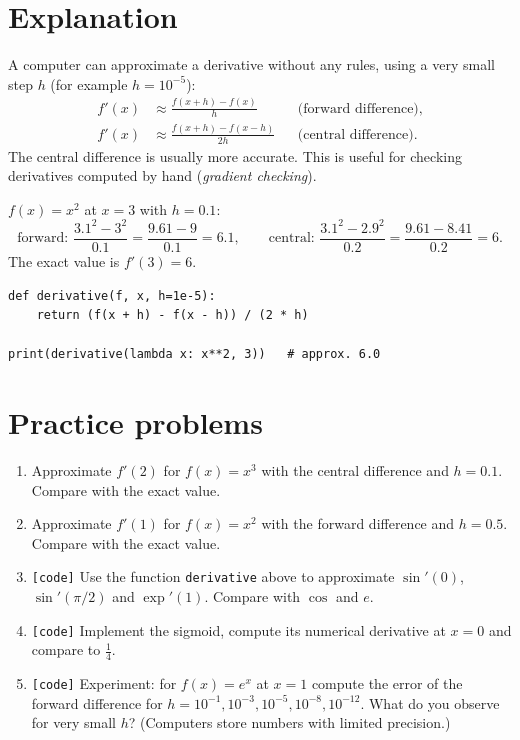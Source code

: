\label{ch:numerical}

\section*{Explanation}
A computer can approximate a derivative without any rules, using a very small step $h$ (for example $h=10^{-5}$):
\begin{align*}
f'(x)&\approx\frac{f(x+h)-f(x)}{h} &&\text{(forward difference)},\\
f'(x)&\approx\frac{f(x+h)-f(x-h)}{2h} &&\text{(central difference)}.
\end{align*}
The central difference is usually more accurate. This is useful for checking derivatives computed by hand (\emph{gradient checking}).

\begin{example}
$f(x)=x^2$ at $x=3$ with $h=0.1$:
\[
\text{forward: }\frac{3.1^2-3^2}{0.1}=\frac{9.61-9}{0.1}=6.1,\qquad
\text{central: }\frac{3.1^2-2.9^2}{0.2}=\frac{9.61-8.41}{0.2}=6.
\]
The exact value is $f'(3)=6$.
\end{example}

\begin{example}[Python]
\begin{verbatim}
def derivative(f, x, h=1e-5):
    return (f(x + h) - f(x - h)) / (2 * h)

print(derivative(lambda x: x**2, 3))   # approx. 6.0
\end{verbatim}
\end{example}

\section*{Practice problems}
\begin{enumerate}[label=\textbf{\thechapter.\arabic*}]
  \item Approximate $f'(2)$ for $f(x)=x^3$ with the central difference and $h=0.1$. Compare with the exact value.
  \item Approximate $f'(1)$ for $f(x)=x^2$ with the forward difference and $h=0.5$. Compare with the exact value.
  \item \texttt{[code]} Use the function \texttt{derivative} above to approximate $\sin'(0)$, $\sin'(\pi/2)$ and $\exp'(1)$. Compare with $\cos$ and $e$.
  \item \texttt{[code]} Implement the sigmoid, compute its numerical derivative at $x=0$ and compare to $\tfrac14$.
  \item[\textbf{\thechapter.5}$\star$] \texttt{[code]} Experiment: for $f(x)=e^x$ at $x=1$ compute the error of the forward difference for $h=10^{-1},10^{-3},10^{-5},10^{-8},10^{-12}$. What do you observe for very small $h$? (Computers store numbers with limited precision.)
\end{enumerate}

